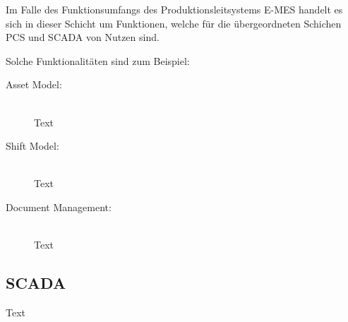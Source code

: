Im Falle des Funktionsumfangs des Produktionsleitsystems \glqq E-MES\grqq{} handelt es sich in dieser Schicht um Funktionen, welche für die übergeordneten Schichen \glqq PCS\grqq{} und \glqq SCADA\grqq{} von Nutzen sind.

Solche Funktionalitäten sind zum Beispiel:

\begin{description}
    \item[Asset Model:]\hfill \\
    Text

    \item[Shift Model:]\hfill \\
    Text

    \item[Document Management:]\hfill \\
    Text

\end{description}

\subsection{SCADA\label{subsec3.1.3:Unterunterpunkt-3}}

Text






